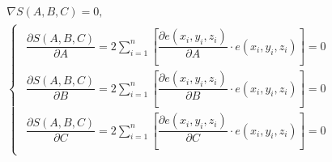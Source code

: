 \begin{gather*}
    \nabla S(A, B, C) = 0, \\
    \begin{cases}
        \begin{aligned}
            \dfrac{\partial S(A, B, C)}{\partial A} = 2 \sum_{i=1}^{n} \left[
            \dfrac{\partial e(x_i, y_i, z_i)}{\partial A} \cdot e(x_i, y_i, z_i) \right] = 0 \\
            \dfrac{\partial S(A, B, C)}{\partial B} = 2 \sum_{i=1}^{n} \left[
            \dfrac{\partial e(x_i, y_i, z_i)}{\partial B} \cdot e(x_i, y_i, z_i) \right] = 0 \\
            \dfrac{\partial S(A, B, C)}{\partial C} = 2 \sum_{i=1}^{n} \left[
            \dfrac{\partial e(x_i, y_i, z_i)}{\partial C} \cdot e(x_i, y_i, z_i) \right] = 0
        \end{aligned}
    \end{cases}
\end{gather*}

